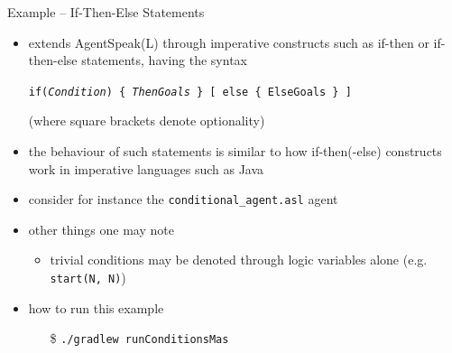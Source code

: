 \documentclass[presentation]{beamer}\mode<presentation>{\usetheme{AMSBolognaFC}}
\begin{document}
\begin{frame}[c, allowframebreaks]{Example \theJasonExample{} -- If-Then-Else Statements}
    \begin{itemize}
        \item \jason{} extends AgentSpeak(L) through imperative constructs such as \alert{if-then} or  \alert{if-then-else} statements, having the syntax
        \begin{center}
            \texttt{if(\textit{Condition}) \{ \textit{ThenGoals} \} \alert{[} else \{ ElseGoals \}  \alert{]}}
        \end{center}
        (where square brackets denote optionality)
        
        \vspace{.3cm}
        
        \item the behaviour of such statements is similar to how if-then(-else) constructs work in imperative languages such as Java
        
        \framebreak
        
        \item consider for instance the \texttt{conditional\_agent.asl} agent
        
        
        \framebreak
        
        \item other things one may note
        \begin{itemize}
            \item trivial conditions may be denoted through logic variables alone (e.g. \texttt{start(N, N)})
        \end{itemize}
        
        \vspace{.3cm}
        
        \item how to run this example
        \begin{itemize}
            \item[\$] \texttt{./gradlew run\alert{Conditions}Mas}
        \end{itemize}
        
    \end{itemize}
\end{frame}
\end{document}
